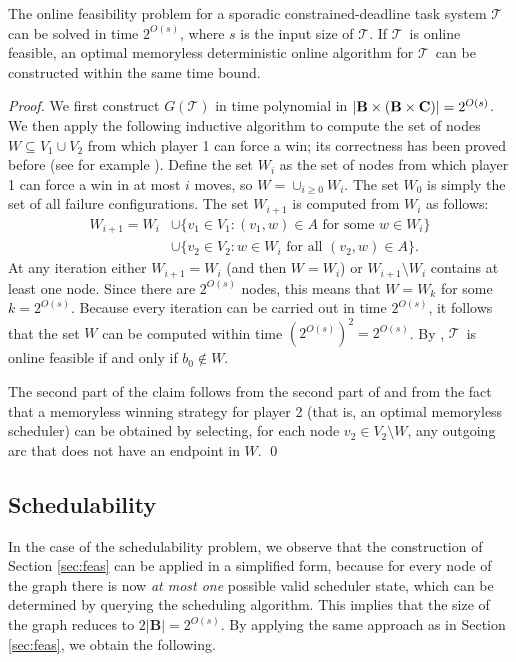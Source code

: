 \documentclass{llncs}
\newcommand{\tsys}{\ensuremath{\mathcal{T}}}
\newcommand{\backlog}{\ensuremath{\mathbf{B}}}
\begin{document}
\begin{theorem}
The online feasibility problem for a sporadic constrained-deadline task system $\tsys$ can be solved in time $2^{O(s)}$, where $s$ is the input size of $\tsys$. If \tsys\ is online feasible, an optimal memoryless deterministic online algorithm for \tsys\ can be constructed within the same time bound. 
\end{theorem}
\begin{proof}
We first construct $G(\tsys)$ in time polynomial in $|\backlog \times (\backlog \times \rct)| = 2^{O(s)}$. We then apply the following inductive algorithm to compute the set of nodes $W \subseteq V_1 \cup V_2$ from which player 1 can force a win; its correctness has been proved before (see for example \cite[Proposition 2.18]{Graedel:2002}). Define the set $W_i$ as the set of nodes from which player 1 can force a win in at most $i$ moves, so $W = \cup_{i \ge 0} W_i$. The set $W_0$ is simply the set of all failure configurations. The set $W_{i+1}$ is computed from $W_i$ as follows: 
\begin{align*}
W_{i+1} = W_i &\cup \{ v_1 \in V_1: (v_1,w) \in A \text{ for some } w \in W_i\} \\
& \cup \{ v_2 \in V_2: w \in W_i \text{ for all } (v_2,w) \in A \}. 
\end{align*}
At any iteration either $W_{i+1} = W_i$ (and then $W = W_i$) or $W_{i+1} \setminus W_i$ contains at least one node. Since there are $2^{O(s)}$ nodes, this means that $W = W_k$ for some $k = 2^{O(s)}$. Because every iteration can be carried out in time $2^{O(s)}$, it follows that the set $W$ can be computed within time $(2^{O(s)})^2 = 2^{O(s)}$. By , \tsys\ is online feasible if and only if $b_0 \notin W$. 

The second part of the claim follows from the second part of  and from the fact that a memoryless winning strategy for player 2 (that is, an optimal memoryless scheduler) can be obtained by selecting, for each node $v_2 \in V_2 \setminus W$, any outgoing arc that does not have an endpoint in $W$.  
\qed
\end{proof}

\subsection{Schedulability}




In the case of the schedulability problem, we observe that the construction of Section \ref{sec:feas} can be applied in a simplified form, because for every node of the graph there is now \emph{at most one} possible valid scheduler state, which can be determined by querying the scheduling algorithm. 
This implies that the size of the graph reduces to $2|\backlog|=2^{O(s)}$. By applying the same approach as in Section \ref{sec:feas}, we obtain the following. 
\end{document}
